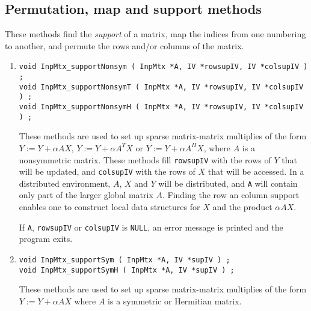 \subsection{Permutation, map and support methods}
\label{subsection:InpMtx:proto:permute}
\par
These methods find the {\it support} of a matrix, map the indices
from one numbering to another, and
permute the rows and/or columns of the matrix.
\par
\begin{enumerate}
\item
\begin{verbatim}
void InpMtx_supportNonsym ( InpMtx *A, IV *rowsupIV, IV *colsupIV ) ;
void InpMtx_supportNonsymT ( InpMtx *A, IV *rowsupIV, IV *colsupIV ) ;
void InpMtx_supportNonsymH ( InpMtx *A, IV *rowsupIV, IV *colsupIV ) ;
\end{verbatim}
These methods are used to set up sparse matrix-matrix multiplies 
of the form $Y := Y + \alpha A X$, $Y := Y + \alpha A^T X$ or
$Y := Y + \alpha A^H X$, where $A$ is a nonsymmetric matrix.
These methods fill {\tt rowsupIV} with the rows of $Y$ that will be
updated, and {\tt colsupIV} with the rows of $X$ that will be
accessed.
In a distributed environment, $A$, $X$ and $Y$ will be distributed,
and {\tt A} will contain only part of the larger global matrix $A$.
Finding the row an column support enables one to construct local
data structures for $X$ and the product $\alpha A X$.
\par {}
If {\tt A}, {\tt rowsupIV} or {\tt colsupIV} is {\tt NULL},
an error message is printed and the program exits.
\item
\begin{verbatim}
void InpMtx_supportSym ( InpMtx *A, IV *supIV ) ;
void InpMtx_supportSymH ( InpMtx *A, IV *supIV ) ;
\end{verbatim}
These methods are used to set up sparse matrix-matrix multiplies 
of the form $Y := Y + \alpha A X$
where $A$ is a symmetric or Hermitian matrix.

\end{enumerate}
